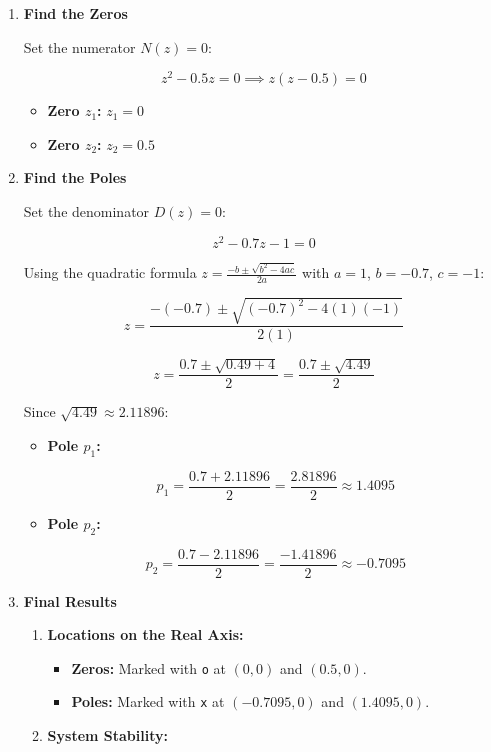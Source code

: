 \begin{enumerate}
\def\labelenumi{\arabic{enumi}.}
\item
  \textbf{Find the Zeros}

  Set the numerator \(N(z) = 0\):

  \[z^2 - 0.5z = 0 \implies z(z - 0.5) = 0\]

  \begin{itemize}
  \item
    \textbf{Zero \(z_1\):} \(z_1 = 0\)
  \item
    \textbf{Zero \(z_2\):} \(z_2 = 0.5\)
  \end{itemize}
\item
  \textbf{Find the Poles}

  Set the denominator \(D(z) = 0\):

  \[z^2 - 0.7z - 1 = 0\]

  Using the quadratic formula \(z = \frac{-b \pm \sqrt{b^2 - 4ac}}{2a}\)
  with \(a = 1\), \(b = -0.7\), \(c = -1\):

  \[z = \frac{-(-0.7) \pm \sqrt{(-0.7)^2 - 4(1)(-1)}}{2(1)}\]

  \[z = \frac{0.7 \pm \sqrt{0.49 + 4}}{2} = \frac{0.7 \pm \sqrt{4.49}}{2}\]

  Since \(\sqrt{4.49} \approx 2.11896\):

  \begin{itemize}
  \item
    \textbf{Pole \(p_1\):}

    \[p_1 = \frac{0.7 + 2.11896}{2} = \frac{2.81896}{2} \approx 1.4095\]
  \item
    \textbf{Pole \(p_2\):}

    \[p_2 = \frac{0.7 - 2.11896}{2} = \frac{-1.41896}{2} \approx -0.7095\]
  \end{itemize}
\item
  \textbf{Final Results}

  \begin{enumerate}
  \def\labelenumii{\arabic{enumii}.}
  \item
    \textbf{Locations on the Real Axis:}

    \begin{itemize}
    \item
      \textbf{Zeros:} Marked with \texttt{o} at \((0, 0)\) and
      \((0.5, 0)\).
    \item
      \textbf{Poles:} Marked with \texttt{x} at \((-0.7095, 0)\) and
      \((1.4095, 0)\).
    \end{itemize}
  \item
    \textbf{System Stability:}


\end{enumerate}
\end{enumerate}
